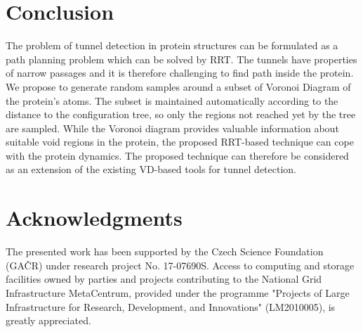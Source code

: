 \documentclass{llncs}
\begin{document}
\section{Conclusion }

The problem of tunnel detection in protein structures can be formulated as a path planning problem which can be solved by RRT.
The tunnels have properties of narrow passages and it is therefore challenging to find path inside the protein.
We propose to generate random samples around a subset of Voronoi Diagram of the protein's atoms.
The subset is maintained automatically according to the distance to the configuration tree, so only the regions not reached yet
by the tree are sampled.
While the Voronoi diagram provides valuable information about suitable void regions in the protein, the
proposed RRT-based technique can cope with the protein dynamics.
The proposed technique can therefore be considered as an extension of the existing VD-based tools for tunnel detection.

\section{Acknowledgments}

The presented work has been supported by the Czech Science Foundation (GA{\v C}R) under research project No. 17-07690S.
Access to computing and storage facilities owned by parties and projects contributing to the National Grid Infrastructure MetaCentrum, provided under the programme "Projects of Large Infrastructure for Research, Development, and Innovations" (LM2010005), is greatly appreciated.




\end{document}
